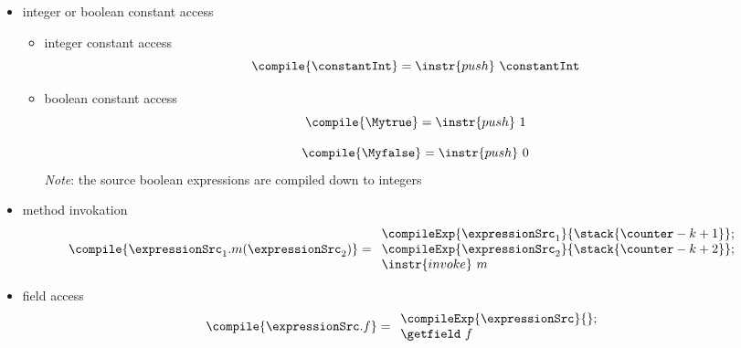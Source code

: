 \begin{itemize}
  \item  integer or boolean constant access 
     \begin{itemize}
            \item  integer constant access 
	         $$\compile{\constantInt} = \instr{push }\  \constantInt $$
	    \item boolean constant access
	          $$\compile{\Mytrue} = \instr{push } \ 1 $$
                   
                  $$\compile{\Myfalse} = \instr{push } \ 0 $$
		  \textit{Note}: the source boolean expressions are compiled down to integers 
     \end{itemize}
  \item  method invokation
     $$\compile{ \expressionSrc_1.m(\expressionSrc_2)} = 
           \begin{array}{l}  
                 \compileExp{\expressionSrc_1}{\stack{\counter - k + 1}};\\ 
		 \compileExp{\expressionSrc_2}{\stack{\counter - k + 2}};\\
		                  
		 
                 \instr{invoke} \ m
            \end{array}     
    $$
  






  \item field access
     $$\compile{ \expressionSrc.f} =   
         \begin{array}{l}
              \compileExp{\expressionSrc}{   }; \\ 
              \getfield  \ f
           \end{array}   
     $$ 


\end{itemize}
